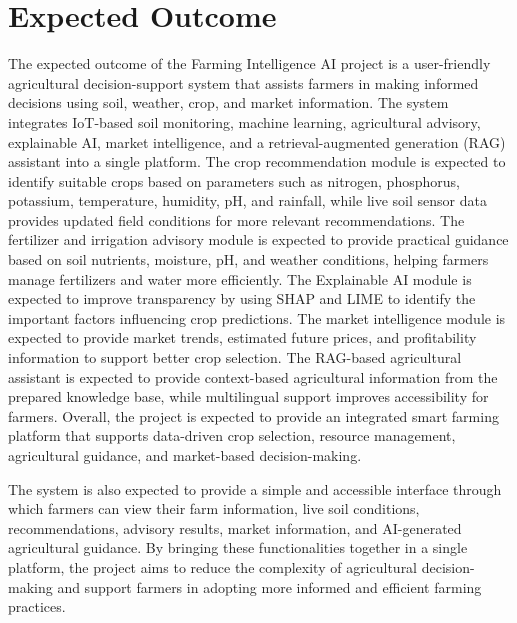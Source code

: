 \chapter{Expected Outcome}

The expected outcome of the Farming Intelligence AI project is a user-friendly agricultural decision-support system that assists farmers in making informed decisions using soil, weather, crop, and market information. The system integrates IoT-based soil monitoring, machine learning, agricultural advisory, explainable AI, market intelligence, and a retrieval-augmented generation (RAG) assistant into a single platform. The crop recommendation module is expected to identify suitable crops based on parameters such as nitrogen, phosphorus, potassium, temperature, humidity, pH, and rainfall, while live soil sensor data provides updated field conditions for more relevant recommendations. The fertilizer and irrigation advisory module is expected to provide practical guidance based on soil nutrients, moisture, pH, and weather conditions, helping farmers manage fertilizers and water more efficiently. The Explainable AI module is expected to improve transparency by using SHAP and LIME to identify the important factors influencing crop predictions. The market intelligence module is expected to provide market trends, estimated future prices, and profitability information to support better crop selection. The RAG-based agricultural assistant is expected to provide context-based agricultural information from the prepared knowledge base, while multilingual support improves accessibility for farmers. Overall, the project is expected to provide an integrated smart farming platform that supports data-driven crop selection, resource management, agricultural guidance, and market-based decision-making.

The system is also expected to provide a simple and accessible interface through which farmers can view their farm information, live soil conditions, recommendations, advisory results, market information, and AI-generated agricultural guidance. By bringing these functionalities together in a single platform, the project aims to reduce the complexity of agricultural decision-making and support farmers in adopting more informed and efficient farming practices.